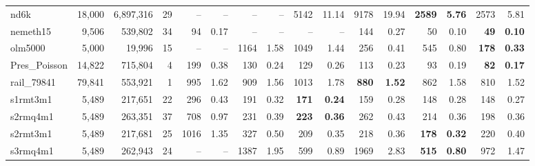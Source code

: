 \begin{landscape}
\begin{table}
\begin{tabular}{lrrr||rr|rr|rr|rr|rr|rr}
                  nd6k  &  18,000  &  6,897,316  &  29  &       --  &       
                  --   &       --  &       --   &     5142 &    11.14  &     
                  9178 &    19.94  & \textbf{    2589} & \textbf{    5.76}  
                  &     2573 &     5.81\\
              nemeth15  &  9,506  &  539,802  &  34  &       94 &     0.17  
              &       --  &       --   &       --  &       --   &      144 
              &     0.27  &       50 &     0.10  & \textbf{      49} & 
              \textbf{    0.10}\\
               olm5000  &  5,000  &  19,996  &  15  &       --  &       --   
               &     1164 &     1.58  &     1049 &     1.44  &      256 &     
               0.41  &      545 &     0.80  & \textbf{     178} & \textbf{    
               0.33}\\
          Pres\_Poisson  &  14,822  &  715,804  &  4  &      199 &     0.38  
          &      130 &     0.24  &      129 &     0.26  &      113 &     0.23  
          &       93 &     0.19  & \textbf{      82} & \textbf{    0.17}\\
            rail\_79841  &  79,841  &  553,921  &  1  &      995 &     1.62  
            &      909 &     1.56  &     1013 &     1.78  & \textbf{     880} & 
            \textbf{    1.52}  &      862 &     1.58  &      810 &     1.52\\
              s1rmt3m1  &  5,489  &  217,651  &  22  &      296 &     0.43  
              &      191 &     0.32  & \textbf{     171} & \textbf{    0.24}  
              &      159 &     0.28  &      148 &     0.28  &      148 &     
              0.27\\
              s2rmq4m1  &  5,489  &  263,351  &  37  &      708 &     0.97  
              &      231 &     0.39  & \textbf{     223} & \textbf{    0.36}  
              &      262 &     0.43  &      214 &     0.36  &      198 &     
              0.36\\
              s2rmt3m1  &  5,489  &  217,681  &  25  &     1016 &     1.35  
              &      327 &     0.50  &      209 &     0.35  &      218 &     
              0.36  & \textbf{     178} & \textbf{    0.32}  &      220 &     
              0.40\\
              s3rmq4m1  &  5,489  &  262,943  &  24  &       --  &       --   
              &     1387 &     1.95  &      599 &     0.89  &     1969 &     
              2.83  & \textbf{     515} & \textbf{    0.80}  &      972 &     
              1.47\\

\end{tabular}
\end{table}
\end{landscape}
